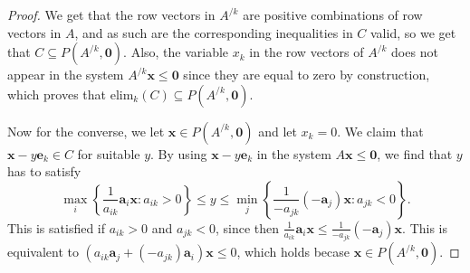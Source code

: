 		\begin{proof}
			We get that the row vectors in $A^{/k}$ are positive combinations of row vectors 
			in $A$, and as such are the corresponding inequalities in $C$ valid, so we get that 
			$C \subseteq P(A^{/k}, \boldsymbol{0})$. Also, the variable $x_k$ in the row 
			vectors of $A^{/k}$ does not appear in the system $A^{/k}\boldsymbol{x} \leq 
			\boldsymbol{0}$ since they are equal to zero by construction, which proves that 
			$\text{elim}_k (C) \subseteq P(A^{/k}, \boldsymbol{0})$. 
			
			Now for the converse, we let $\boldsymbol{x} \in P(A^{/k}, \boldsymbol{0})$ and 
			let $x_k = 0$. 
			We claim that $\boldsymbol{x} - y \boldsymbol{e}_k \in C$ for suitable $y$. 
			By using $\boldsymbol{x} - y \boldsymbol{e}_k$ in the system $A\boldsymbol{x} \leq 
			\boldsymbol{0}$, we find that $y$ has to satisfy 
			\[
			\max_i \left\{ \frac{1}{a_{ik}}\boldsymbol{a}_i \boldsymbol{x} : a_{ik} > 0\right\} 
			\leq y \leq \min_j \left\{ \frac{1}{-a_{jk}}(-\boldsymbol{a}_j)\boldsymbol{x} : a_{jk} 
			< 0 \right\}. 
			\]
			This is satisfied if $a_{ik} > 0$ and $a_{jk} < 0$, since then $\frac{1}{a_{ik}} 
			\boldsymbol{a}_i \boldsymbol{x} \leq \frac{1}{-a_{jk}} (-\boldsymbol{a}_j) 
			\boldsymbol{x}$. 
			This is equivalent to $(a_{ik}\boldsymbol{a}_j + (-a_{jk})\boldsymbol{a}_i)
			\boldsymbol{x} \leq 0$, which holds becase $\boldsymbol{x} \in P(A^{/k}, 
			\boldsymbol{0})$.
		\end{proof}
		
		
